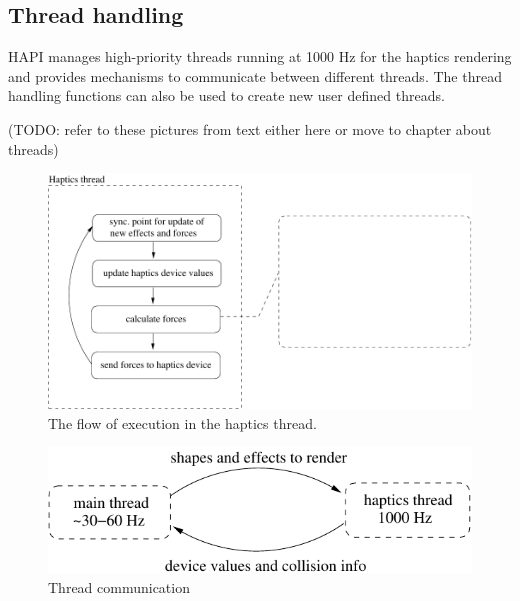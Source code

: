 \subsection{Thread handling}
HAPI manages high-priority threads running at 1000 Hz for the haptics
rendering and provides mechanisms to communicate between different
threads. The thread handling functions can also be used to create new
user defined threads.      

(TODO: refer to these pictures from text either here or move to chapter about threads)

\begin{figure} 
  \centering 
  \includegraphics{images/hapticsthread.pdf}
  \caption{The flow of execution in the haptics thread.}
  \label{haptics thread} 
\end{figure}

\begin{figure} 
  \centering 
  \includegraphics{images/threads.pdf}
  \caption{Thread communication}
  \label{threads} 
\end{figure}